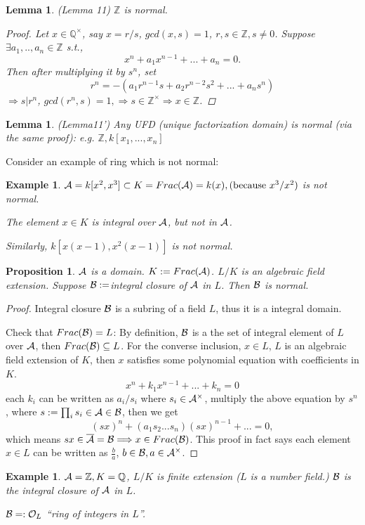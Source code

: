 \documentclass[11pt]{article}
\newtheorem{prop}[thm]{Proposition}
\newtheorem{lemma}[thm]{Lemma}
\newtheorem{ex}[thm]{Example}
\newcommand{\intg}{\mathbb Z}
\newcommand{\ratl}{\mathbb Q}
\newcommand{\cala}{{\cal A}}
\newcommand{\calb}{{\cal B}}
\newcommand{\calo}{{\cal O}}
\newcommand{\Lrta}{\Longrightarrow}
\begin{document}
\begin{lemma}\label{lem:integral_lemma11}(Lemma 11)
$\intg$ is normal.
\begin{proof}
Let $x\in \ratl^\times$, say $x=r/s$, $gcd(x,s)=1$, $r,s\in\intg, s\neq 0$. Suppose $\exists a_1,..,a_n\in\intg$ s.t.,
$$
x^n+a_1 x^{n-1}+...+a_n=0.
$$
Then after multiplying it by $s^n$, set
$$
r^n=-(a_1 r^{n-1}s+a_2 r^{n-2}s^2+...+a_n s^n)
$$
$\Lrta s|r^n$, $gcd(r^n,s)=1,\Lrta s\in \intg^\times\Lrta x\in \intg$.
\end{proof}
\end{lemma}

\begin{lemma}\label{lem:integral_lemma11'}(Lemma11')
Any UFD (unique factorization domain) is normal (via the same proof): e.g. $\intg,k[x_1,...,x_n]$
\end{lemma}

Consider an example of ring which is not normal:
\begin{ex}
$\cala=k[x^2,x^3]\subset K=Frac(\cala)=k(x),(\text{because } x^3/x^2)$ is not normal.

The element $x\in K$ is integral over $\cala$, but not in $\cala$.

Similarly, $k[x(x-1),x^2(x-1)]$ is not normal.
\end{ex}
\begin{prop}\label{prop:integral_closure_in_algebraic_field_extension}
$\cala$ is a domain. $K:=Frac(\cala)$. $L/K$ is an algebraic field extension. Suppose $\calb:=$integral closure of $\cala$ in $L$. Then $\calb$ is normal.
\end{prop}
\begin{proof}
Integral closure $\calb$ is a subring of a field $L$, thus it is a integral domain.

Check that $Frac(\calb)=L$: By definition, $\calb$ is a the set of integral element of $L$ over $\cala$, then $Frac(\calb)\subseteq L$. For the converse inclusion, $x\in L$, $L$ is an algebraic field extension of $K$, then $x$ satisfies some  polynomial equation with coefficients in $K$.
$$
x^n+k_1 x^{n-1}+...+k_n=0
$$
each $k_i$ can be written as $a_i/s_i$ where $s_i\in \cala^\times $, multiply the above equation by $s^n$, where $s:=\prod_i s_i\in \cala\in\calb$,
then we get
$$
(s x)^n+(a_1s_2...s_n) (s x)^{n-1}+...=0,
$$
which means $sx\in\overline{\cala}= \calb\Lrta x\in Frac(\calb)$. This proof in fact says each element $x\in L$ can be written as $\frac{b}{a}$, $b\in\calb, a\in\cala^\times$.
\end{proof}
\begin{ex}
$\cala=\intg, K=\ratl$, $L/K$ is finite extension ($L$ is a number field.) $\calb$ is the integral closure of $\cala$ in $L$.

$\calb=:\calo_L$ ``ring of integers in $L$''.
\end{ex}
\end{document}
